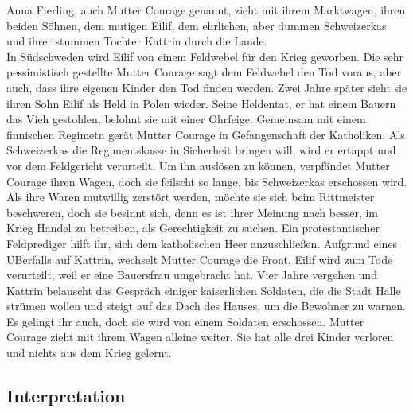 \documentclass[a4paper]{article}
\begin{document}
	Anna Fierling, auch Mutter Courage genannt, zieht mit ihrem Marktwagen, ihren beiden Söhnen, dem mutigen Eilif, dem ehrlichen, aber dummen Schweizerkas und ihrer stummen Tochter Kattrin durch die Lande.\\
        In Südschweden wird Eilif von einem Feldwebel für den Krieg geworben. Die sehr pessimistisch gestellte Mutter Courage sagt dem Feldwebel den Tod voraus, aber auch, dass ihre eigenen Kinder den Tod finden werden. Zwei Jahre später sieht sie ihren Sohn Eilif als Held in Polen wieder. Seine Heldentat, er hat einem Bauern das Vieh gestohlen, belohnt sie mit einer Ohrfeige. Gemeinsam mit einem finnischen Regimetn gerät Mutter Courage in Gefangenschaft der Katholiken. Als Schweizerkas die Regimentskasse in Sicherheit bringen will, wird er ertappt und vor dem Feldgericht verurteilt. Um ihn auslösen zu können, verpfändet Mutter Courage ihren Wagen, doch sie feilscht so lange, bis Schweizerkas erschossen wird. Als ihre Waren mutwillig zerstört werden, möchte sie sich beim Rittmeister beschweren, doch sie besinnt sich, denn es ist ihrer Meinung nach besser, im Krieg Handel zu betreiben, als Gerechtigkeit zu suchen. Ein protestantischer Feldprediger hilft ihr, sich dem katholischen Heer anzuschließen. Aufgrund eines ÜBerfalls auf Kattrin, wechselt Mutter Courage die Front. Eilif wird zum Tode verurteilt, weil er eine Bauersfrau umgebracht hat. Vier Jahre vergehen und Kattrin belauscht das Gespräch einiger kaiserlichen Soldaten, die die Stadt Halle strümen wollen und steigt auf das Dach des Hauses, um die Bewohner zu warnen. Es gelingt ihr auch, doch sie wird von einem Soldaten erschossen. Mutter Courage zieht mit ihrem Wagen alleine weiter. Sie hat alle drei Kinder verloren und nichts aus dem Krieg gelernt.
       
        \subsection{Interpretation}
\end{document}
